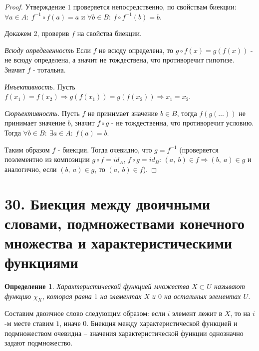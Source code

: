 \documentclass[a4paper,12pt]{article}
\newtheorem*{defin}{Определение}
\begin{document}
        \begin{proof}
            Утверждение $1$ проверяется непосредственно, по свойствам биекции: $\forall a \in A:\ f^{-1} \circ f(a) = a$ и
                     $\forall b \in B:\ f \circ f^{-1}(b) = b$.

            Докажем 2, проверив $f$ на свойства биекции.

            \textit{Всюду определенность}
            Если $f$ не всюду определена, то  $g \circ f(x) = g(f(x))$ - не всюду определена, а значит не тождествена, что противоречит гипотизе. Значит $f$ - тотальна.

            \textit{Инъективность.}
            Пусть $f(x_1) = f(x_2) \Rightarrow g(f(x_1)) = g(f(x_2)) \Rightarrow x_1 = x_2$.

            \textit{Сюръективность.}
            Пусть $f$ не принимает значение $b \in B$, тогда $f(g(\ldots))$ не принимает значение $b$, значит $f \circ g$ - не тождественна, что противоречит условию. Тогда $\forall b \in B:\ \exists a \in A:\ f(a) = b$.

            Таким образом $f$ - биекция. Тогда очевидно, что $g = f^{-1}$ (проверяется поэлементно из композиции $g \circ f = id_A$, $f \circ g = id_B$: $(a,\ b) \in f \Rightarrow (b,\ a) \in g$ и аналогично, если $(b,\ a) \in g$, то $(a,\ b) \in f$).
        \end{proof}

    \section*{30. Биекция между двоичными словами, подмножествами конечного множества и характеристическими функциями}

        \begin{defin}
            Характеристической функцией множества $X \subset U$ называют функцию $\displaystyle\chi_{X}$, которая равна $1$ на элементах $X$ и $0$ на остальных элементах $U$.
        \end{defin}
        Составим двоичное слово следующим образом: если $i$ элемент лежит в $X$, то на $i$-м месте ставим $1$, иначе $0$. Биекция между характеристической функцией и подмножеством очевидна -- значения характеристической функции однозначно задают подмножество.
\end{document}
